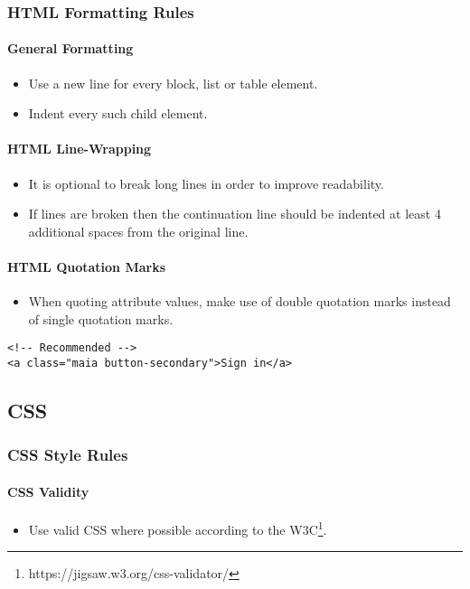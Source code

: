 \documentclass[a4paper, 11pt]{article}
\begin{document}
\subsubsection{HTML Formatting Rules}

\paragraph{General Formatting}
\begin{itemize}
\item Use a new line for every block, list or table element.
\item Indent every such child element.
\end{itemize}

\paragraph{HTML Line-Wrapping}
\begin{itemize}
\item It is optional to break long lines in order to improve readability.
\item If lines are broken then the continuation line should be indented at least 4 additional spaces from the original line.
\end{itemize}

\paragraph{HTML Quotation Marks}
\begin{itemize}
\item When quoting attribute values, make use of double quotation marks instead of single quotation marks.
\end{itemize}
\begin{verbatim}
<!-- Recommended -->
<a class="maia button-secondary">Sign in</a>
\end{verbatim}

\pagebreak

\subsection{CSS}

\subsubsection{CSS Style Rules}

\paragraph{CSS Validity}
\begin{itemize}
\item Use valid CSS where possible according to the W3C\footnote{https://jigsaw.w3.org/css-validator/}.
\end{itemize}
\end{document}
